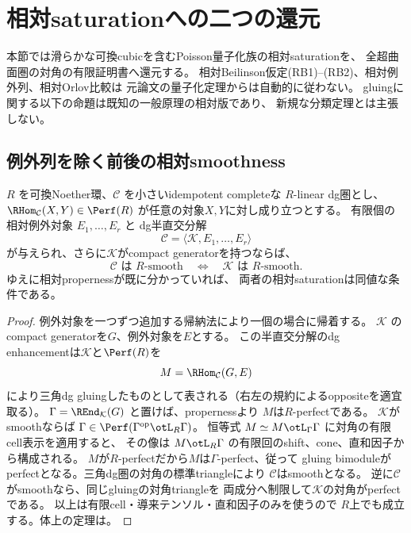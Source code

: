 \section{相対saturationへの二つの還元}
\label{sec:relative-saturation-reduction}
本節では滑らかな可換cubicを含むPoisson量子化族の相対saturationを、
全超曲面圏の対角の有限証明書へ還元する。
相対Beilinson仮定(RB1)--(RB2)、相対例外列、相対Orlov比較は
元論文の量子化定理からは自動的に従わない。
gluingに関する以下の命題は既知の一般原理の相対版であり、
新規な分類定理とは主張しない\cite[Theorem 3.25]{OrlovGlue}。

\subsection{例外列を除く前後の相対smoothness}
\begin{proposition}[相対smoothnessの同値]
\label{prop:saturation-reduction}
$R$ を可換Noether環、$\mathcal C$ を小さいidempotent completeな
$R$-linear dg圏とし、
$\RHom_{\mathcal C}(X,Y)\in\Perf(R)$ が任意の対象$X,Y$に対し成り立つとする。
有限個の相対例外対象 $E_1,\ldots,E_r$ と
dg半直交分解
\[
\mathcal C=\langle\mathcal K,E_1,\ldots,E_r\rangle
\]
が与えられ、さらに$\mathcal K$がcompact generatorを持つならば、
\[
\mathcal C\text{ は }R\text{-smooth}
\quad\Longleftrightarrow\quad
\mathcal K\text{ は }R\text{-smooth}.
\]
ゆえに相対propernessが既に分かっていれば、
両者の相対saturationは同値な条件である。
\end{proposition}
\begin{proof}
例外対象を一つずつ追加する帰納法により一個の場合に帰着する。
$\mathcal K$ のcompact generatorを$G$、例外対象を$E$とする。
この半直交分解のdg enhancementは$\mathcal K$と$\Perf(R)$を
\[
M=\RHom_{\mathcal C}(G,E)
\]
により三角dg gluingしたものとして表される（右左の規約によるoppositeを適宜取る）。
$\Gamma=\REnd_{\mathcal K}(G)$ と置けば、propernessより
$M$は$R$-perfectである。
$\mathcal K$がsmoothならば
$\Gamma\in\Perf(\Gamma^{\mathrm{op}}\otL_R\Gamma)$。
恒等式 $M\simeq M\otL_\Gamma\Gamma$ に対角の有限cell表示を適用すると、
その像は $M\otL_R\Gamma$ の有限回のshift、cone、直和因子から構成される。
$M$が$R$-perfectだから$M$は$\Gamma$-perfect、従って
gluing bimoduleがperfectとなる。三角dg圏の対角の標準triangleにより
$\mathcal C$はsmoothとなる。
逆に$\mathcal C$がsmoothなら、同じgluingの対角triangleを
両成分へ制限して$\mathcal K$の対角がperfectである。
以上は有限cell・導来テンソル・直和因子のみを使うので
$R$上でも成立する。体上の定理は\cite[Theorem 3.25]{OrlovGlue}。
\end{proof}

